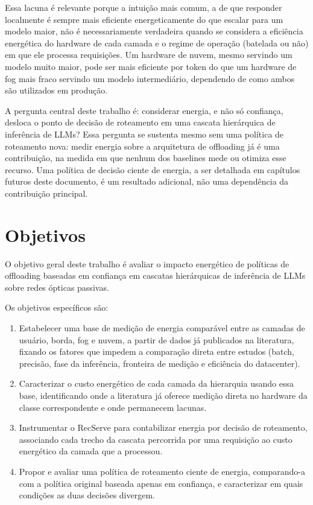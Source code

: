 \documentclass[cic,dipl]{infufrgs}
\begin{document}
Essa lacuna \'e relevante porque a intui\c{c}\~ao mais comum, a de que
responder localmente \'e sempre mais eficiente energeticamente do que
escalar para um modelo maior, n\~ao \'e necessariamente verdadeira quando
se considera a efici\^encia energ\'etica do hardware de cada camada e o
regime de opera\c{c}\~ao (batelada ou n\~ao) em que ele processa
requisi\c{c}\~oes. Um hardware de nuvem, mesmo servindo um modelo muito
maior, pode ser mais eficiente por token do que um hardware de fog mais
fraco servindo um modelo intermedi\'ario, dependendo de como ambos s\~ao
utilizados em produ\c{c}\~ao.

A pergunta central deste trabalho \'e: considerar energia, e n\~ao s\'o
confian\c{c}a, desloca o ponto de decis\~ao de roteamento em uma cascata
hier\'arquica de infer\^encia de LLMs? Essa pergunta se sustenta mesmo
sem uma pol\'itica de roteamento nova: medir energia sobre a arquitetura
de offloading j\'a \'e uma contribui\c{c}\~ao, na medida em que nenhum
dos baselines mede ou otimiza esse recurso. Uma pol\'itica de decis\~ao
ciente de energia, a ser detalhada em cap\'itulos futuros deste
documento, \'e um resultado adicional, n\~ao uma depend\^encia da
contribui\c{c}\~ao principal.

\section{Objetivos}

O objetivo geral deste trabalho \'e avaliar o impacto energ\'etico de
pol\'iticas de offloading baseadas em confian\c{c}a em cascatas
hier\'arquicas de infer\^encia de LLMs sobre redes \'opticas passivas.

Os objetivos espec\'ificos s\~ao:

\begin{enumerate}
  \item Estabelecer uma base de medi\c{c}\~ao de energia compar\'avel
    entre as camadas de usu\'ario, borda, fog e nuvem, a partir de dados
    j\'a publicados na literatura, fixando os fatores que impedem a
    compara\c{c}\~ao direta entre estudos (batch, precis\~ao, fase da
    infer\^encia, fronteira de medi\c{c}\~ao e efici\^encia do
    datacenter).
  \item Caracterizar o custo energ\'etico de cada camada da hierarquia
    usando essa base, identificando onde a literatura j\'a oferece
    medi\c{c}\~ao direta no hardware da classe correspondente e onde
    permanecem lacunas.
  \item Instrumentar o RecServe para contabilizar energia por decis\~ao
    de roteamento, associando cada trecho da cascata percorrida por uma
    requisi\c{c}\~ao ao custo energ\'etico da camada que a processou.
  \item Propor e avaliar uma pol\'itica de roteamento ciente de energia,
    comparando-a com a pol\'itica original baseada apenas em confian\c{c}a,
    e caracterizar em quais condi\c{c}\~oes as duas decis\~oes divergem.
\end{enumerate}
\end{document}

